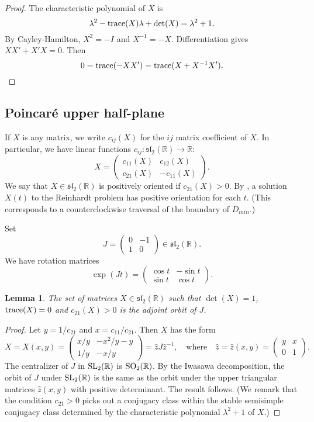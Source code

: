 \documentclass{article}
\newtheorem{lemma}[theorem]{Lemma}
\theoremstyle{remark}
\newcommand{\ring}[1]{\mathbb{#1}}
\newcommand{\op}[1]{\hbox{#1}}
\def\sl{\mathfrak{sl}_2(\ring{R})}
\def\SL{\op{SL}_2(\ring{R})}
\def\SO{\op{SO}_2(\ring{R})}
\def\DR{D_{min}}
\begin{document}
\begin{proof} 
The characteristic polynomial of $X$ is
\[
\lambda^2 - \op{trace}(X)\lambda + \det(X) = \lambda^2+1.
\]
By Cayley-Hamilton, $X^2=-I$ and $X^{-1}=-X$.  
Differentiation gives $X X' + X' X=0$.
Then
\[
0 = \op{trace}(-X X') = \op{trace}(X + X^{-1} X').
\]
\end{proof}


\subsection{Poincar\'e upper half-plane}\label{sec:upper-half}

If $X$ is any matrix, we write
 $c_{ij}(X)$ for the $ij$ matrix coefficient of $X$.
In particular, we have linear functions $c_{ij}:\sl\to\ring{R}$:
\[
X = \begin{pmatrix}c_{11}(X)& c_{12}(X) \\ 
c_{21}(X) & - c_{11}(X)\end{pmatrix}.
\]
We say that $X\in\sl$ is positively oriented if $c_{21}(X) >0$.
 By \cite[\S3.5]{hales2011reinhardt}, a solution $X(t)$ to the Reinhardt
problem has positive orientation for each $t$.  
(This corresponds to a counterclockwise
traversal of the boundary of $\DR$.)

Set
\[
J = \begin{pmatrix} 0 & -1 \\ 1 & 0\end{pmatrix} \in \sl.
\]
We have rotation matrices
\[
\exp(J t) = \begin{pmatrix} \cos t & -\sin t\\ \sin t & \cos t\end{pmatrix}.
\]

\begin{lemma} 
The set of matrices $X\in\sl$ such
  that $\det(X)=1$, $\op{trace}(X)=0$ and $c_{21}(X)>0$ is the adjoint orbit
  of $J$.
\end{lemma}

\begin{proof}
  Let $y = 1/c_{21}$ and $x = c_{11}/c_{21}$.  Then $X$ has the form
\begin{equation}\label{eqn:orbit}
X = X(x,y)=
 \begin{pmatrix} x/y & -x^2/y - y \\ 1/y & -x / y\end{pmatrix} 
= \hat z J \hat z^{-1},
\quad \text{where} \quad \hat z = \hat z(x,y) = 
\begin{pmatrix} y & x \\ 0 & 1\end{pmatrix}.
\end{equation}
The centralizer of $J$ in $\SL$ is $\SO$.  By the
Iwasawa decomposition, the orbit of $J$ under $\SL$ is the same as the
orbit under the upper triangular matrices $\hat z(x,y)$ with positive
determinant.  The result follows.  (We remark that the condition $c_{21}>0$
picks out a conjugacy class within the stable semisimple conjugacy class
determined by the characteristic polynomial $\lambda^2 + 1$ of $X$.)
\end{proof}
\end{document}
